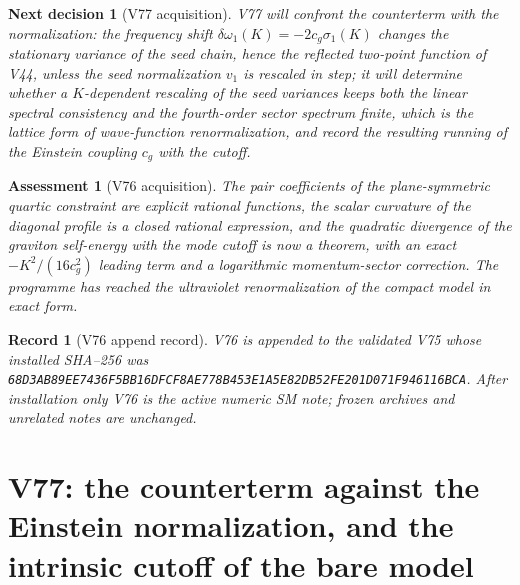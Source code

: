 \documentclass[11pt]{article}
\newtheorem{decision}[theorem]{Next decision}
\newtheorem{assessment}[theorem]{Assessment}
\newtheorem{record}[theorem]{Record}
\theoremstyle{remark}
\begin{document}
\begin{decision}[V77 acquisition]
\label{dec:v19v76-next}
V77 will confront the counterterm with the normalization: the
frequency shift \(\delta\omega_1(K)=-2c_g\sigma_1(K)\) changes the
stationary variance of the seed chain, hence the reflected two-point
function of V44, unless the seed normalization \(v_1\) is rescaled in
step; it will determine whether a \(K\)-dependent rescaling of the
seed variances keeps both the linear spectral consistency and the
fourth-order sector spectrum finite, which is the lattice form of
wave-function renormalization, and record the resulting running of
the Einstein coupling \(c_g\) with the cutoff.
\end{decision}

\begin{assessment}[V76 acquisition]
\label{ass:v19v76}
The pair coefficients of the plane-symmetric quartic constraint are
explicit rational functions, the scalar curvature of the diagonal
profile is a closed rational expression, and the quadratic divergence
of the graviton self-energy with the mode cutoff is now a theorem,
with an exact \(-K^2/(16c_g^2)\) leading term and a logarithmic
momentum-sector correction.  The programme has reached the ultraviolet
renormalization of the compact model in exact form.
\end{assessment}

\begin{record}[V76 append record]
\label{rec:v19v76}
V76 is appended to the validated V75 whose installed SHA--256 was
\texttt{68D3AB89EE7436F5BB16DFCF8AE778B453E1A5E82DB52FE201D071F946116BCA}.
After installation only V76 is the active numeric SM note; frozen
archives and unrelated notes are unchanged.
\end{record}


\section{V77: the counterterm against the Einstein normalization, and the intrinsic cutoff of the bare model}
\label{sec:v19v77}
\end{document}
